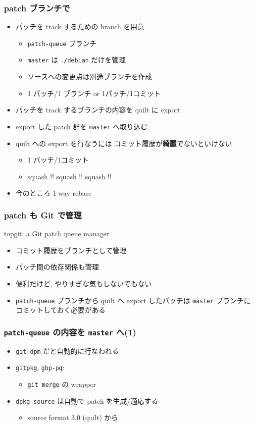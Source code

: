 \documentclass[10pt,final,c,dvipdfmx,cjk,colorlinks=false]{beamer}
\providecommand{\alert}[1]{\textbf{#1}}
\begin{document}
\begin{frame}
\frametitle{patch ブランチで}
\label{sec-4-4}


\begin{itemize}
\item パッチを track するための branch を用意
\begin{itemize}
\item \texttt{patch-queue} ブランチ
\item \texttt{master} は \texttt{./debian} だけを管理
\item ソースへの変更点は別途ブランチを作成
\item 1 パッチ/1 ブランチ or 1パッチ/1コミット
\end{itemize}
\item パッチを track するブランチの内容を quilt に export
\item export した patch 群を \texttt{master} へ取り込む
\item quilt への export を行なうには
  コミット履歴が\alert{綺麗}でないといけない
\begin{itemize}
\item 1 パッチ/1コミット
\item squash !! squash !! squash !!
\end{itemize}
\item 今のところ 1-way rebase
\end{itemize}
\end{frame}
\begin{frame}
\frametitle{patch も Git で管理}
\label{sec-4-5}
\begin{block}{topgit: a Git patch queue manager}
\label{sec-4-5-1}

\begin{itemize}
\item コミット履歴をブランチとして管理
\item パッチ間の依存関係も管理
\item 便利だけど, やりすぎな気もしないでもない
\item \texttt{patch-queue} ブランチから quilt へ export したパッチは
  \texttt{master} ブランチにコミットしておく必要がある
\end{itemize}
\end{block}
\end{frame}
\begin{frame}
\frametitle{\texttt{patch-queue} の内容を \texttt{master} へ(1)}
\label{sec-4-6}


\begin{itemize}
\item \texttt{git-dpm} だと自動的に行なわれる
\item \texttt{gitpkg}, \texttt{gbp-pq}:
\begin{itemize}
\item \texttt{git merge} の wrapper
\end{itemize}
\item \texttt{dpkg-source} は自動で patch を生成/適応する
\begin{itemize}
\item source format 3.0 (quilt) から
\end{itemize}
\end{itemize}
\end{frame}
\end{document}
